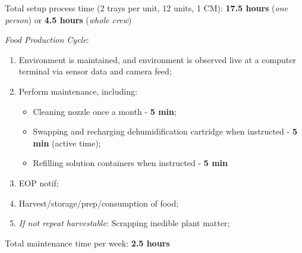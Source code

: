 \documentclass{report}
\begin{document}
Total setup process time (2 trays per unit, 12 units, 1 CM): \textbf{17.5 hours} (\textit{one person}) or \textbf{4.5 hours} (\textit{whole crew})

\textit{Food Production Cycle}:

\begin{enumerate}
    \item Environment is maintained, and environment is observed live at a computer terminal via sensor data and camera feed;
    \item Perform maintenance, including:
    \begin{itemize}
        \item Cleaning nozzle once a month - \textbf{5 min};
        \item Swapping and recharging dehumidification cartridge when instructed - \textbf{5 min} (active time);
        \item Refilling solution containers when instructed - \textbf{5 min}
    \end{itemize}
    \item EOP notif;
    \item Harvest/storage/prep/consumption of food;
    \item \textit{If not repeat harvestable}: Scrapping inedible plant matter;
\end{enumerate}

Total maintenance time per week: \textbf{2.5 hours}






\end{document}
